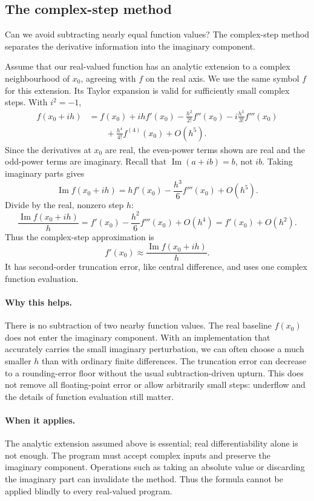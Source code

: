 \subsection{The complex-step method}
Can we avoid subtracting nearly equal function values? The complex-step method separates the derivative information into the imaginary component.

Assume that our real-valued function has an analytic extension to a complex neighbourhood of $x_0$, agreeing with $f$ on the real axis. We use the same symbol $f$ for this extension. Its Taylor expansion is valid for sufficiently small complex steps. With $i^2=-1$,
\begin{align*}
 f(x_0+ih)
 &=f(x_0)+ihf'(x_0)-\frac{h^2}{2!}f''(x_0)
   -i\frac{h^3}{3!}f'''(x_0)\\
 &\qquad+\frac{h^4}{4!}f^{(4)}(x_0)+O(h^5).
\end{align*}
Since the derivatives at $x_0$ are real, the even-power terms shown are real and the odd-power terms are imaginary. Recall that $\operatorname{Im}(a+ib)=b$, not $ib$. Taking imaginary parts gives
\[
 \operatorname{Im}f(x_0+ih)
 =hf'(x_0)-\frac{h^3}{6}f'''(x_0)+O(h^5).
\]
Divide by the real, nonzero step $h$:
\begin{equation}
 \frac{\operatorname{Im}f(x_0+ih)}{h}
 =f'(x_0)-\frac{h^2}{6}f'''(x_0)+O(h^4)
 =f'(x_0)+O(h^2).
 \label{eq:lec07-complex-step}
\end{equation}
Thus the complex-step approximation is
\[
 \boxed{f'(x_0)\approx\frac{\operatorname{Im}f(x_0+ih)}{h}.}
\]
It has second-order truncation error, like central difference, and uses one complex function evaluation.

\paragraph{Why this helps.}
There is no subtraction of two nearby function values. The real baseline $f(x_0)$ does not enter the imaginary component. With an implementation that accurately carries the small imaginary perturbation, we can often choose a much smaller $h$ than with ordinary finite differences. The truncation error can decrease to a rounding-error floor without the usual subtraction-driven upturn. This does not remove all floating-point error or allow arbitrarily small steps: underflow and the details of function evaluation still matter.

\paragraph{When it applies.}
The analytic extension assumed above is essential; real differentiability alone is not enough. The program must accept complex inputs and preserve the imaginary component. Operations such as taking an absolute value or discarding the imaginary part can invalidate the method. Thus the formula cannot be applied blindly to every real-valued program.

